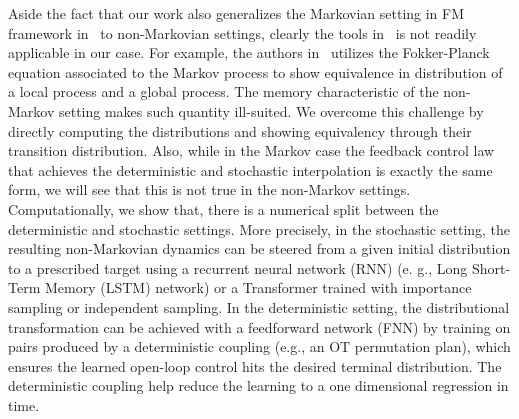 \documentclass[12pt]{amsart}
\renewcommand{\(}{\left (}
\renewcommand{\)}{\right )}
\numberwithin{equation}{section}
\begin{document}
Aside the fact that our work also generalizes the Markovian setting in FM framework in~\cite{YM-MA-AT-YC:24} to non-Markovian settings, clearly the tools in~\cite{YM-MA-AT-YC:24} is not readily applicable in our case. For example, the authors in~\cite{YM-MA-AT-YC:24} utilizes the Fokker-Planck equation associated to the Markov process to show equivalence in distribution of a local process and a global process. The memory characteristic of the non-Markov setting makes such quantity ill-suited. 
We overcome this challenge by directly computing the distributions and showing equivalency through their transition distribution. Also, while in the Markov case the feedback control law that achieves the deterministic and stochastic interpolation is exactly the same form, we will see that this is not true in the non-Markov settings. Computationally, we show that, there is a numerical split between the deterministic and stochastic settings. More precisely, in the stochastic setting, the resulting non-Markovian dynamics can be steered from a given initial distribution to a prescribed target using a recurrent neural network (RNN) (e. g., Long Short-Term Memory (LSTM) network)  or a Transformer trained with importance sampling or independent sampling. In the deterministic setting, the distributional transformation can be achieved with a feedforward network (FNN) by training on pairs produced by a deterministic coupling (e.g., an OT permutation plan), which ensures the learned open-loop control hits the desired terminal distribution. The deterministic coupling help reduce the learning to a one dimensional regression in time. 

\end{document}
